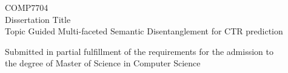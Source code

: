 \begin{titlepage}
\begin{center}

\vspace{30pt} %
\begin{center}
    {COMP7704}\\[10pt] %
    {Dissertation Title}\\ %
    {Topic Guided Multi-faceted Semantic Disentanglement for CTR prediction}\\[20pt] %
\end{center}

\vspace{40pt} %


\begin{center}
    {Submitted in partial fulfillment of the requirements for the admission to\\
    the degree of Master of Science in Computer Science}\\[20pt]
\end{center}


\end{center}
\end{titlepage}
